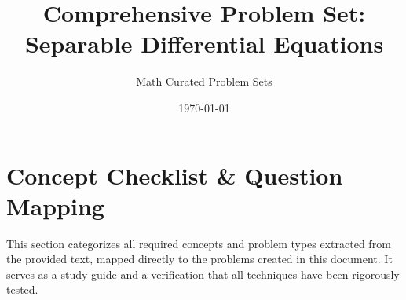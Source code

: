 \documentclass[11pt]{article}
\title{Comprehensive Problem Set: Separable Differential Equations}
\author{Math Curated Problem Sets}
\date{\today}
\begin{document}
\maketitle
\tableofcontents
\newpage

\section{Concept Checklist \& Question Mapping}
This section categorizes all required concepts and problem types extracted from the provided text, mapped directly to the problems created in this document. It serves as a study guide and a verification that all techniques have been rigorously tested.
\end{document}
